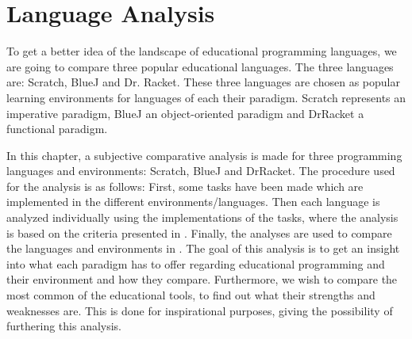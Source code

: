 \chapter{Language Analysis}
\label{chap:language_analysis}
To get a better idea of the landscape of educational programming languages, we are going to compare three popular educational languages.
The three languages are: Scratch, BlueJ and Dr. Racket.
These three languages are chosen as popular learning environments for languages of each their paradigm.
Scratch represents an imperative paradigm, BlueJ an object-oriented paradigm and DrRacket a functional paradigm.

In this chapter, a subjective comparative analysis is made for three programming languages and environments: Scratch, BlueJ and DrRacket. The procedure used for the analysis is as follows: First, some tasks have been made which are implemented in the different environments/languages. Then each language is analyzed individually using the implementations of the tasks, where the analysis is based on the criteria presented in . Finally, the analyses are used to compare the languages and environments in . The goal of this analysis is to get an insight into what each paradigm has to offer regarding educational programming and their environment and how they compare. Furthermore, we wish to compare the most common of the educational tools, to find out what their strengths and weaknesses are. This is done for inspirational purposes, giving the possibility of furthering this analysis.

